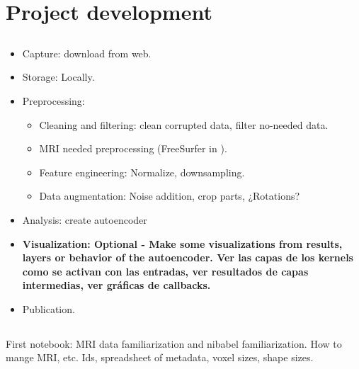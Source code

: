 \chapter{Project development}
\label{chapter:development}


\section{}

\section{}
\label{section:datalifecycle}

\begin{itemize}
    \item Capture: download from web.
    \item Storage: Locally.
    \item Preprocessing:
    \begin{itemize}
        \item Cleaning and filtering: clean corrupted data, filter no-needed data.
        \item MRI needed preprocessing (FreeSurfer in \cite{pinaya2019}).
        \item Feature engineering: Normalize, downsampling.
        \item Data augmentation: Noise addition, crop parts, ¿Rotations?
    \end{itemize}
    \item Analysis: create autoencoder
    \item \textbf{Visualization: Optional - Make some visualizations from results, layers or behavior of the autoencoder. Ver las capas de los kernels como se activan con las entradas, ver resultados de capas intermedias, ver gráficas de callbacks.}
    \item Publication.
\end{itemize}

\section{}

First notebook: MRI data familiarization and nibabel familiarization. How to mange MRI, etc. Ids, spreadsheet of metadata, voxel sizes, shape sizes.

